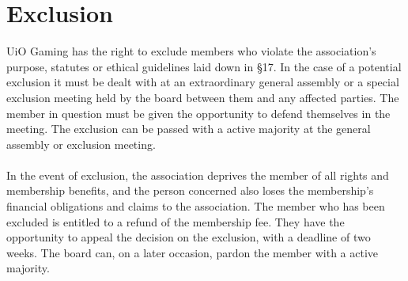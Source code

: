 \documentclass[12pt,a4paper,norsk]{article}
\begin{document}
\section{Exclusion}

UiO Gaming has the right to exclude members who violate the association's purpose, statutes or ethical guidelines laid down in §17. In the case of a potential exclusion it must be dealt with at an extraordinary general assembly or a special exclusion meeting held by the board between them and any affected parties. The member in question must be given the opportunity to defend themselves in the meeting. The exclusion can be passed with a  active majority at the general assembly or exclusion meeting. 
\\
\\
In the event of exclusion, the association deprives the member of all rights and membership benefits, and the person concerned also loses the membership's financial obligations and claims to the association. The member who has been excluded is entitled to a refund of the membership fee. They have the opportunity to appeal the decision on the exclusion, with a deadline of two weeks. The board can, on a later occasion, pardon the member with a  active majority.
\end{document}

